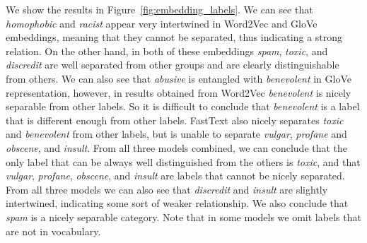 \documentclass[fleqn,moreauthors,10pt]{ds_report}
\begin{document}
We show the results in Figure~\ref{fig:embedding_labels}. We can see that \textit{homophobic} and \textit{racist} appear very intertwined in Word2Vec and GloVe embeddings, meaning that they cannot be separated, thus indicating a strong relation. On the other hand, in both of these embeddings \textit{spam}, \textit{toxic}, and \textit{discredit} are well separated from other groups and are clearly distinguishable from others. We can also see that \textit{abusive} is entangled with \textit{benevolent} in GloVe representation, however, in results obtained from Word2Vec  \textit{benevolent} is nicely separable from other labels. So it is difficult to conclude that \textit{benevolent} is a label that is different enough from other labels. FastText also nicely separates \textit{toxic} and \textit{benevolent} from other labels, but is unable to separate \textit{vulgar}, \textit{profane} and \textit{obscene}, and \textit{insult}. From all three models combined, we can conclude that the only label that can be always well distinguished from the others is \textit{toxic}, and that \textit{vulgar}, \textit{profane}, \textit{obscene}, and \textit{insult} are labels that cannot be nicely separated. From all three models we can also see that \textit{discredit} and \textit{insult} are slightly intertwined, indicating some sort of weaker relationship. We also conclude that \textit{spam} is a nicely separable category. Note that in some models we omit labels that are not in vocabulary.
\end{document}
